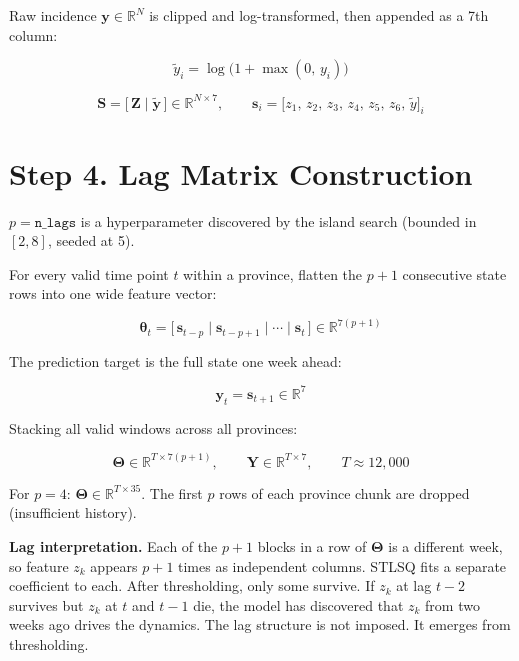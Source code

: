 \documentclass{article}
\begin{document}
Raw incidence $\mathbf{y} \in \mathbb{R}^{N}$ is clipped and log-transformed,
then appended as a 7th column:

\begin{equation}
    \tilde{y}_i = \log\!\bigl(1 + \max(0,\, y_i)\bigr)
\end{equation}

\begin{equation}
    \mathbf{S}
    = \bigl[\,\mathbf{Z} \mid \tilde{\mathbf{y}}\,\bigr]
    \in \mathbb{R}^{N \times 7},
    \qquad
    \mathbf{s}_i = \bigl[z_1,\, z_2,\, z_3,\, z_4,\, z_5,\, z_6,\, \tilde{y}\bigr]_i
\end{equation}

\section*{Step 4. Lag Matrix Construction}

$p = \texttt{n\_lags}$ is a hyperparameter discovered by the island search (bounded in $[2,8]$, seeded at 5).

For every valid time point $t$ within a province, flatten the $p+1$ consecutive state rows into one wide feature vector:

\begin{equation}
    \boldsymbol{\theta}_t
    = \bigl[\,\mathbf{s}_{t-p} \mid \mathbf{s}_{t-p+1} \mid \cdots \mid \mathbf{s}_{t}\,\bigr]
    \in \mathbb{R}^{7(p+1)}
\end{equation}

The prediction target is the full state one week ahead:

\begin{equation}
    \mathbf{y}_t = \mathbf{s}_{t+1} \in \mathbb{R}^{7}
\end{equation}

Stacking all valid windows across all provinces:

\begin{equation}
    \boldsymbol{\Theta} \in \mathbb{R}^{T \times 7(p+1)},
    \qquad
    \mathbf{Y} \in \mathbb{R}^{T \times 7},
    \qquad T \approx 12{,}000
\end{equation}

For $p = 4$: $\boldsymbol{\Theta} \in \mathbb{R}^{T \times 35}$.
The first $p$ rows of each province chunk are dropped (insufficient history).

\medskip
\noindent\textbf{Lag interpretation.}
Each of the $p+1$ blocks in a row of $\boldsymbol{\Theta}$ is a different week,
so feature $z_k$ appears $p+1$ times as independent columns.
STLSQ fits a separate coefficient to each. After thresholding, only some survive.
If $z_k$ at lag $t-2$ survives but $z_k$ at $t$ and $t-1$ die,
the model has discovered that $z_k$ from two weeks ago drives the dynamics.
The lag structure is not imposed. It emerges from thresholding.
\end{document}
